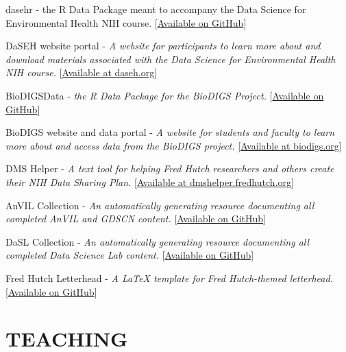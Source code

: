 \documentclass{cv}
\begin{document}
dasehr - the R Data Package meant to accompany the Data Science for Environmental Health NIH course. [\href{https://github.com/fhdsl/dasehr}{Available on GitHub}]

DaSEH website portal - \textit{A website for participants to learn more about and download materials associated with the Data Science for Environmental Health NIH course.} [\href{https://daseh.org}{Available at daseh.org}]

BioDIGSData - \textit{the R Data Package for the BioDIGS Project.} [\href{https://github.com/fhdsl/BioDIGSData}{Available on GitHub}]

BioDIGS website and data portal - \textit{A website for students and faculty to learn more about and access data from the BioDIGS project.} [\href{https://biodigs.org}{Available at biodigs.org}]

DMS Helper - \textit{A text tool for helping Fred Hutch researchers and others create their NIH Data Sharing Plan.} [\href{https://dmshelper.fredhutch.org}{Available at dmshelper.fredhutch.org}]

AnVIL Collection - \textit{An automatically generating resource documenting all completed AnVIL and GDSCN content.} [\href{https://github.com/fhdsl/AnVIL_Collection}{Available on GitHub}]

DaSL Collection - \textit{An automatically generating resource documenting all completed Data Science Lab content.} [\href{https://github.com/fhdsl/DaSL_Collection}{Available on GitHub}]

Fred Hutch Letterhead - \textit{A LaTeX template for Fred Hutch-themed letterhead.} [\href{https://github.com/fhdsl/FH_letterhead}{Available on GitHub}]



\newpage
{}
\parttwo



\section*{TEACHING}
\end{document}
